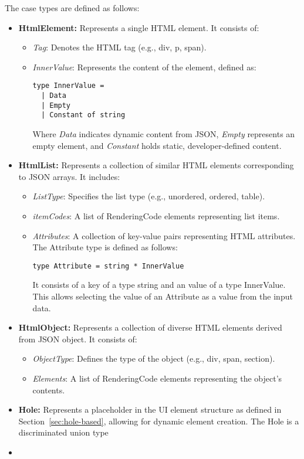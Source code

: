 The case types are defined as follows:
\begin{itemize}
	\item \textbf{HtmlElement:} Represents a single HTML element. It consists of:
	      \begin{itemize}
		      \item \emph{Tag}: Denotes the HTML tag (e.g., div, p, span).

		      \item \emph{InnerValue}: Represents the content of the element, defined as:
		            \begin{lstlisting}
type InnerValue =
  | Data 
  | Empty
  | Constant of string  
        \end{lstlisting}
		            Where \emph{Data} indicates dynamic content from JSON, \emph{Empty} represents an empty element, and \emph{Constant} holds static, developer-defined content.
	      \end{itemize}	\item \textbf{HtmlList:} Represents a collection of similar HTML elements corresponding to JSON arrays. It includes:
	      \begin{itemize}
		      \item \emph{ListType}: Specifies the list type (e.g., unordered, ordered, table).
		      \item \emph{itemCodes}: A list of RenderingCode elements representing list items.
		      \item {\emph{Attributes}: A collection of key-value pairs representing HTML attributes.
		            The Attribute type is defined as follows:
		            \begin{lstlisting}
type Attribute = string * InnerValue
              \end{lstlisting}
		            It consists of a key of a type string and an value of a type InnerValue. This allows selecting the value of an Attribute as a value from the input data.
		            }

	      \end{itemize}
	\item \textbf{HtmlObject:} Represents a collection of diverse HTML elements derived from JSON object. It consists of:
	      \begin{itemize}
		      \item \emph{ObjectType}: Defines the type of the object (e.g., div, span, section).
		      \item \emph{Elements}: A list of RenderingCode elements representing the object's contents.
	      \end{itemize}
	\item {\textbf{Hole:} Represents a placeholder in the UI element structure as defined in Section~\ref{sec:hole-based}, allowing for dynamic element creation.
	      The Hole is a discriminated union type
	      }


	\item  {}
\end{itemize}


